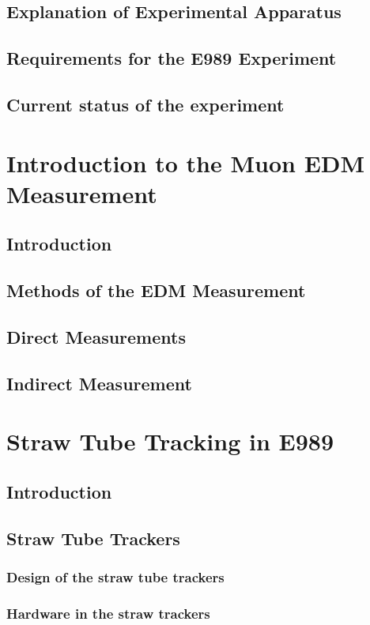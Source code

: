 \documentclass[11pt, oneside]{article}   	%
\begin{document}
	\subsection{Explanation of Experimental Apparatus}
	\subsection{Requirements for the E989 Experiment}
	\subsection{Current status of the experiment}
	
	
\section{Introduction to the Muon EDM Measurement}
	\subsection{Introduction}
	\subsection{Methods of the EDM Measurement}
	\subsection{Direct Measurements}
	\subsection{Indirect Measurement}
	
	
\section{Straw Tube Tracking in E989}
	\subsection{Introduction}
	\subsection{Straw Tube Trackers}
		\subsubsection{Design of the straw tube trackers}
		\subsubsection{Hardware in the straw trackers}
\end{document}
